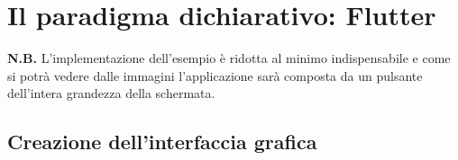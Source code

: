 \section{Il paradigma dichiarativo: Flutter}
\label{sec:paradigma-dichiarativo-flutter}

\textbf{N.B.} L'implementazione dell'esempio è ridotta al minimo indispensabile e come si potrà vedere dalle immagini l'applicazione sarà composta da un pulsante dell'intera grandezza della schermata.

\subsection{Creazione dell'interfaccia grafica}
\label{subsec:creazione-ui-qt}

